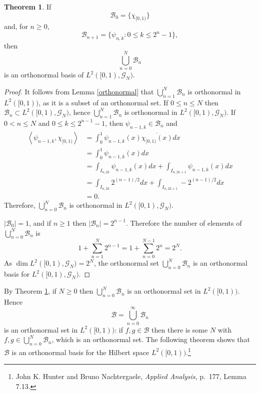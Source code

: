 \documentclass{article}
\newcommand{\inner}[2]{\left\langle #1, #2 \right\rangle}
\theoremstyle{definition}
\newtheorem{theorem}{Theorem}
\theoremstyle{definition}
\begin{document}
\begin{theorem}
If
\[
\mathscr{B}_0=\{\chi_{[0,1)}\}
\]
and, for $n \geq 0$,
\[
\mathscr{B}_{n+1}=\{\psi_{n,k}: 0 \leq k \leq 2^n-1\},
\]
then
\[
\bigcup_{n=0}^N \mathscr{B}_n
\]
is an orthonormal basis of $L^2([0,1),\mathscr{G}_N)$.
\label{orthonormalGN}
\end{theorem}
\begin{proof}
It follows from Lemma \ref{orthonormal} that $\bigcup_{n=1}^N \mathscr{B}_n$ is orthonormal
in  $L^2([0,1))$, as it is a subset of an orthonormal set.
If $0 \leq n \leq N$ then $\mathscr{B}_n \subset L^2([0,1),\mathscr{G}_N)$, hence
$\bigcup_{n=1}^N \mathscr{B}_n$ is orthonormal  in $L^2([0,1),\mathscr{G}_N)$.
If $0 <n \leq N$ and $0 \leq k \leq 2^{n-1}-1$, then $\psi_{n-1,k} \in \mathscr{B}_n$ and
\begin{align*}
\inner{\psi_{n-1,k}}{\chi_{[0,1)}}&=\int_0^1 \psi_{n-1,k}(x) \overline{\chi_{[0,1)}(x)}dx\\
&=\int_0^1 \psi_{n-1,k}(x)dx\\
&=\int_{I_{n,2k}} \psi_{n-1,k}(x) dx + \int_{I_{n,2k+1}} \psi_{n-1,k}(x) dx\\
&=\int_{I_{n,2k}} 2^{(n-1)/2} dx + \int_{I_{n,2k+1}} -2^{(n-1)/2} dx\\
&=0.
\end{align*} 
Therefore, $\bigcup_{n=0}^N \mathscr{B}_n$ is orthonormal in $L^2([0,1),\mathscr{G}_N)$.


$|\mathscr{B}_0|=1$, and if $n \geq 1$ then $|\mathscr{B}_n|=2^{n-1}$. Therefore
the number of elements of $\bigcup_{n=0}^N \mathscr{B}_n$ is
\[
1+\sum_{n=1}^N 2^{n-1} = 1+\sum_{n=0}^{N-1} 2^n = 2^N.
\]
As $\dim L^2([0,1),\mathscr{G}_N)=2^N$, the orthonormal set $\bigcup_{n=0}^N \mathscr{B}_n$ is an orthonormal basis for $L^2([0,1),\mathscr{G}_N)$.
\end{proof}


By Theorem \ref{orthonormalGN}, if $N \geq 0$ then $\bigcup_{n=0}^N \mathscr{B}_n$ is an orthonormal set in $L^2([0,1))$.
Hence
\[
\mathscr{B}=\bigcup_{n=0}^\infty \mathscr{B}_n
\]
 is an orthonormal set in $L^2([0,1))$: if $f,g \in \mathscr{B}$ then there is some $N$ with $f,g \in
 \bigcup_{n=0}^N \mathscr{B}_n$, which is an orthonormal set.
The following theorem shows that $\mathscr{B}$ is an orthonormal basis for the Hilbert space $L^2([0,1))$.\footnote{John K. Hunter and Bruno
Nachtergaele, {\em Applied Analysis}, p.~177, Lemma 7.13.}
\end{document}
